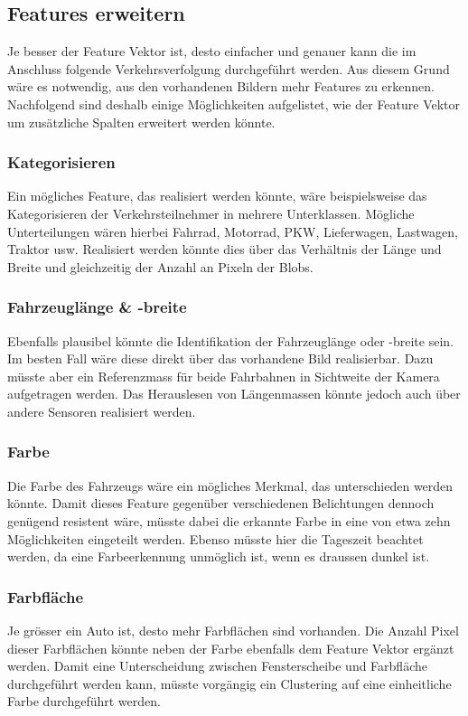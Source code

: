 \subsection{Features erweitern}
Je besser der Feature Vektor ist, desto einfacher und genauer kann die im Anschluss folgende Verkehrsverfolgung durchgeführt werden. Aus diesem Grund wäre es notwendig, aus den vorhandenen Bildern mehr Features zu erkennen. Nachfolgend sind deshalb einige Möglichkeiten aufgelistet, wie der Feature Vektor um zusätzliche Spalten erweitert werden könnte.

\subsubsection{Kategorisieren}
Ein mögliches Feature, das realisiert werden könnte, wäre beispielsweise das Kategorisieren der Verkehrsteilnehmer in mehrere Unterklassen. Mögliche Unterteilungen wären hierbei Fahrrad, Motorrad, PKW, Lieferwagen, Lastwagen, Traktor usw. Realisiert werden könnte dies über das Verhältnis der Länge und Breite und gleichzeitig der Anzahl an Pixeln der Blobs.

\subsubsection{Fahrzeuglänge \& -breite}
Ebenfalls plausibel könnte die Identifikation der Fahrzeuglänge oder -breite sein. Im besten Fall wäre diese direkt über das vorhandene Bild realisierbar. Dazu müsste aber ein Referenzmass für beide Fahrbahnen in Sichtweite der Kamera aufgetragen werden. Das Herauslesen von Längenmassen könnte jedoch auch über andere Sensoren realisiert werden.

\subsubsection{Farbe}
Die Farbe des Fahrzeugs wäre ein mögliches Merkmal, das unterschieden werden könnte. Damit dieses Feature gegenüber verschiedenen Belichtungen dennoch genügend resistent wäre, müsste dabei die erkannte Farbe in eine von etwa zehn Möglichkeiten eingeteilt werden. Ebenso müsste hier die Tageszeit beachtet werden, da eine Farbeerkennung unmöglich ist, wenn es draussen dunkel ist.

\subsubsection{Farbfläche}
Je grösser ein Auto ist, desto mehr Farbflächen sind vorhanden. Die Anzahl Pixel dieser Farbflächen könnte neben der Farbe ebenfalls dem Feature Vektor ergänzt werden. Damit eine Unterscheidung zwischen Fensterscheibe und Farbfläche durchgeführt werden kann, müsste vorgängig ein Clustering auf eine einheitliche Farbe durchgeführt werden.

